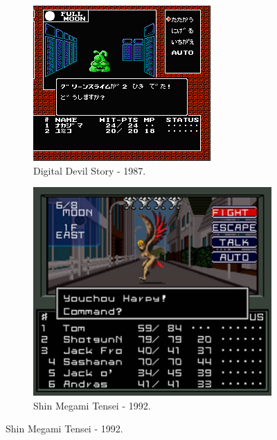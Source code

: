 \begin{figure}[h!]
  \centering
  \begin{subfigure}[b]{0.4\linewidth}
    \includegraphics[width=\linewidth]{mtb.jpg}
     \caption{Digital Devil Story - 1987.}
  \end{subfigure}
  \begin{subfigure}[b]{0.4\linewidth}
    \includegraphics[width=\linewidth]{smt1b.jpg}
    \caption{Shin Megami Tensei - 1992.}

\end{subfigure}
\end{figure}
